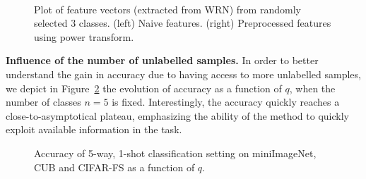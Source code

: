 \documentclass[review]{elsarticle}
\begin{document}
\begin{figure}[h]
\centering
{}\qquad
{}\\
\caption{Plot of feature vectors (extracted from WRN) from randomly selected 3 classes. (left) Naive features. (right)  Preprocessed features using power transform.}
\label{fig:analysept2}
\end{figure}


\textbf{Influence of the number of unlabelled samples.} In order to better understand the gain in accuracy due to having access to more unlabelled samples, we depict in Figure~\ref{fig:functionofq} the evolution of accuracy as a function of $q$, when the number of classes $n=5$ is fixed. Interestingly, the accuracy quickly reaches a close-to-asymptotical plateau, emphasizing the ability of the method to quickly exploit available information in the task.

\begin{figure}[h]
  \begin{center}
  \end{center}
  \vspace{-.5cm}
  \caption{Accuracy of 5-way, 1-shot classification setting on miniImageNet, CUB and CIFAR-FS as a function of $q$.}
  \label{fig:functionofq}
\end{figure}
\end{document}
